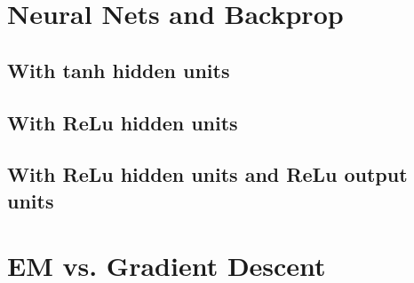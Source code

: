 \documentclass{article}
\begin{document}
\section{Neural Nets and Backprop}
\subsection{With tanh hidden units}

\subsection{With ReLu hidden units}

\subsection{With ReLu hidden units and ReLu output units}


\section{EM vs. Gradient Descent}


\end{document}

